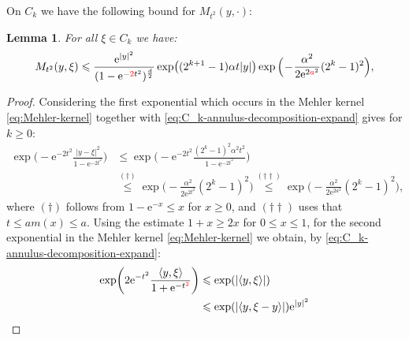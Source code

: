 \documentclass{amsart}
\newtheorem{lemma}{Lemma}
\theoremstyle{remark}
\newcommand{\la}{\langle}
\newcommand{\ra}{\rangle}
\renewcommand{\leq}{\leqslant}
\renewcommand{\leq}{\leqslant}
\renewcommand{\geq}{\geqslant}
\newcommand{\e}{\mathrm{e}} %
\renewcommand{\leq}{\leqslant}%
\renewcommand{\geq}{\geqslant}%
\newcommand{\red}{\color{red}}
\begin{document}
On $C_k$ we have the following bound for $M_{t^2}(y,\cdot)$:
\begin{lemma}\label{lem:On-diagonal-kernel-estimates-on-Ck}
  For all $\xi \in C_k$ we have:
  \begin{equation}
    M_{t^2}(y, \xi) \leq \frac{\e^{|y|^2}}{(1 - \e^{-{\red 2}{t^2}})^{\frac{d}2}}
    \exp\bigl((2^{k + 1} - 1) \alpha t |y| \bigr) \exp\Big(\!-\!\frac{\alpha^2}{2 \e^{2{\red a}^2}} (2^k - 1)^2 \Big),
  \end{equation}
\end{lemma}
\begin{proof}
 Considering the first
  exponential which occurs in the Mehler kernel
  \eqref{eq:Mehler-kernel} together with
  \eqref{eq:C_k-annulus-decomposition-expand} gives for $k \geq 0$:
  \begin{align*}
    \exp\biggl(-\e^{-2t^2} \frac{|y - \xi|^2}{1 - \e^{-2t^2}} \biggr)
    &\leq \exp\biggl(-\e^{-2t^2} \frac{(2^k - 1)^2 \alpha^2 t^2}{1 - \e^{-2t^2}} \biggr)\\
    &\overset{(\dagger)}{\leq} \exp\biggl(-\frac{\alpha^2}{2 \e^{2t^2}} (2^k - 1)^2 \biggr)
    \overset{(\dagger\dagger)}{\leq} \exp\biggl(-\frac{\alpha^2}{2 \e^{2a^2}} (2^k - 1)^2 \biggr),
  \end{align*}
  where $(\dagger)$ follows from $1-\e^{-x} \leq x$ for $x\ge 0$, and $(\dagger\dagger)$
  uses that $t\le am(x)\le a$.
Using the estimate $1+x \ge 2x$ for $0\leq x\leq1$, 
for the second exponential in the Mehler kernel \eqref{eq:Mehler-kernel} we obtain,
by \eqref{eq:C_k-annulus-decomposition-expand}:
  \begin{align*}
    \exp\biggl(2\e^{-t^2} \frac{\la y, \xi \ra}{1 + \e^{- t^{{\red 2}}}}
    \biggr)
    & \leq \exp(|\la y, \xi \ra|)\\
    & \leq \exp(|\langle y, \xi-y\rangle|) \e^{|y|^2}\\

\end{align*}
\end{proof}
\end{document}
